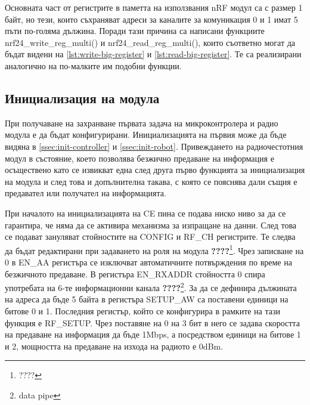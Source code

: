 Основната част от регистрите в паметта на използвания nRF модул са с размер 1 байт, но тези, които съхраняват адреси за каналите за комуникация 0 и 1 имат 5 пъти по-голяма дължина. Поради тази причина са написани функциите nrf24\_write\_reg\_multi() и nrf24\_read\_reg\_multi(), които съответно могат да бъдат видени на \autoref{lst:write-big-register} и \autoref{lst:read-big-register}. Те са реализирани аналогично на по-малките им подобни функции.







\subsection{Инициализация на модула}
\label{ssec:init}

При получаване на захранване първата задача на микроконтролера и радио модула е да бъдат конфигурирани. Инициализацията на първия може да бъде видяна в \cref{ssec:init-controller} и \cref{ssec:init-robot}. Привеждането на радиочестотния модул в състояние, което позволява безжично предаване на информация е осъществено като се извикват една след друга първо функцията за инициализация на модула и след това и допълнителна такава, с която се пояснява дали същия е предавател или получател на информацията.

При началото на инициализацията на CE пина се подава ниско ниво за да се гарантира, че няма да се активира механизма за изпращане на данни. След това се подават зануляват стойностите на CONFIG и RF\_CH регистрите. Те следва да бъдат редактирани при задаването на роля на модула \textbf{????}\footnote{????}. Чрез записване на 0 в EN\_AA регистъра се изключват автоматичните потвърждения по време на безжичното предаване. В регистъра EN\_RXADDR стойността 0 спира употребата на 6-те информационни канала \textbf{????}\footnote{data pipe}. За да се дефинира дължината на адреса да бъде 5 байта в регистъра SETUP\_AW са поставени единици на битове 0 и 1. Последния регистър, който се конфигурира в рамките на тази функция е RF\_SETUP. Чрез поставяне на 0 на 3 бит в него се задава скоростта на предаване на информация да бъде 1Mbps, а посредством единици на битове 1 и 2, мощността на предаване на изхода на радиото е 0dBm. 


